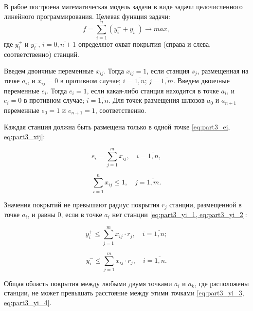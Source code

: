 В рабое построена математическая модель задачи в виде задачи целочисленного линейного программирования. Целевая функция задачи:
\begin{equation}
    \label{eq:part3_objective_function}
    f =  \sum\limits_{i=1}^n (y_i^- + y_i^+) \rightarrow max,
  \end{equation}
где $y_i^+$ и $y_i^-$, $i= \overline{0,n+1}$ определяют охват покрытия (справа и слева, соответственно) станций.


Введем двоичные переменные $x_{ij}$. Тогда $x_{ij}=1$, если станция $s_j$, размещенная на точке $a_i$, и $x_{ij}=0$ в противном случае; $i= \overline{1, n}$; $j = \overline{1,m}$. Введем двоичные переменные $ e_i $. Тогда $ e_i = 1 $, если какая-либо станция находится в точке $ a_i $, и $ e_i = 0$  в противном случае; $ i = \overline {1, n} $. Для точек размещения шлюзов $ a_0 $ и $a_{n + 1}$ переменные $ e_0 = 1 $ и $ e_{n + 1} =1 $, соответственно.




Каждая станция должна быть размещена только в одной точке \cref{eq:part3_ei, eq:part3_xij}:

\begin{equation}
    \label{eq:part3_ei}
    e_i =  \sum\limits_{j=1}^m x_{ij}, \quad i = \overline{1,n},
  \end{equation}

\begin{equation}
  \label{eq:part3_xij}
  \sum\limits_{i=1}^n x_{ij} \leq 1, \quad j = \overline{1,m}. 
\end{equation}

Значения покрытий не превышают радиус покрытия $r_j$ станции, размещенной в точке $ a_i $, и равны 0, если в точке $a_i$  нет станции \cref{eq:part3_yi_1, eq:part3_yi_2}:

\begin{equation}
  \label{eq:part3_yi_1}
  y_i^+ \leq \sum\limits_{j=1}^m x_{ij} \cdot r_j, \quad i = \overline{1,n};
\end{equation}

\begin{equation}
  \label{eq:part3_yi_2}
  y_i^- \leq \sum\limits_{j=1}^m x_{ij} \cdot r_j, \quad i = \overline{1,n}. 
\end{equation}

Общая область покрытия между любыми двумя точками $ a_i $ и $ a_k $, где расположены станции, не может превышать расстояние между этими точками \cref{eq:part3_yi_3, eq:part3_yi_4}.

